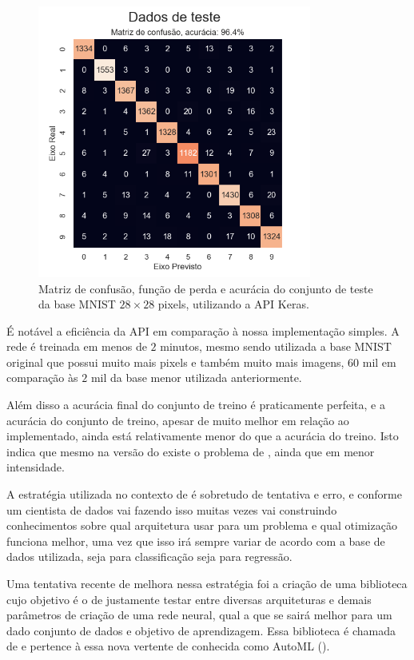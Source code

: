 \begin{figure}[htb]
\centering
\includegraphics[width=9cm]{figuras/keras_test_2}
\caption{Matriz de confusão, função de perda e acurácia do conjunto de teste da base MNIST ${28\times28}$ pixels, utilizando a API Keras.}
\label{fig:keras_test_2}
\end{figure}

É notável a eficiência da API em comparação à nossa implementação simples. A rede é treinada em menos de $2$ minutos, mesmo sendo utilizada a base MNIST original que possui muito mais pixels e também muito mais imagens, $60$ mil em comparação às $2$ mil da base menor utilizada anteriormente. 

Além disso a acurácia final do conjunto de treino é praticamente perfeita, e a acurácia do conjunto de treino, apesar de muito melhor em relação ao  implementado, ainda está relativamente menor do que a acurácia do treino. Isto indica que mesmo na versão  do  existe o problema de , ainda que em menor intensidade.

A estratégia utilizada no contexto de  é sobretudo de tentativa e erro, e conforme um cientista de dados vai fazendo isso muitas vezes vai construindo conhecimentos sobre qual arquitetura usar para um problema e qual otimização funciona melhor, uma vez que isso irá sempre variar de acordo com a base de dados utilizada, seja para classificação seja para regressão.

Uma tentativa recente de melhora nessa estratégia foi a criação de uma biblioteca cujo objetivo é o de justamente testar entre diversas arquiteturas e demais parâmetros de criação de uma rede neural, qual a que se sairá melhor para um dado conjunto de dados e objetivo de aprendizagem. Essa biblioteca é chamada de  e pertence à essa nova vertente de  conhecida como AutoML ().

